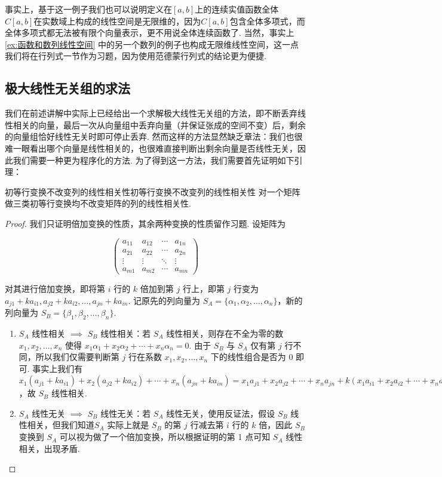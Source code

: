 事实上，基于这一例子我们也可以说明定义在$[a,b]$上的连续实值函数全体$C[a,b]$在实数域上构成的线性空间是无限维的，因为$C[a,b]$包含全体多项式，而全体多项式都无法被有限个向量表示，更不用说全体连续函数了. 当然，事实上\autoref{ex:函数和数列线性空间} 中的另一个数列的例子也构成无限维线性空间，这一点我们将在行列式一节作为习题，因为使用范德蒙行列式的结论更为便捷.

\subsection{极大线性无关组的求法}

我们在前述讲解中实际上已经给出一个求解极大线性无关组的方法，即不断丢弃线性相关的向量，最后一次从向量组中丢弃向量（并保证张成的空间不变）后，剩余的向量组恰好线性无关时即可停止丢弃. 然而这样的方法显然缺乏章法：我们也很难一眼看出哪个向量是线性相关的，也很难直接判断出剩余向量是否线性无关，因此我们需要一种更为程序化的方法. 为了得到这一方法，我们需要首先证明如下引理：

\begin{lemma}{初等行变换不改变列的线性相关性}{初等行变换不改变列的线性相关性}
    对一个矩阵做三类初等行变换均不改变矩阵的列的线性相关性.
\end{lemma}

\begin{proof}
    我们只证明倍加变换的性质，其余两种变换的性质留作习题. 设矩阵为

    \[\begin{pmatrix}
            a_{11} & a_{12} & \cdots & a_{1n} \\
            a_{21} & a_{22} & \cdots & a_{2n} \\
            \vdots & \vdots & \ddots & \vdots \\
            a_{m1} & a_{m2} & \cdots & a_{mn}
        \end{pmatrix}\]

    对其进行倍加变换，即将第 $i$ 行的 $k$ 倍加到第 $j$ 行上，即第 $j$ 行变为 $a_{j1} + ka_{i1}, a_{j2} + ka_{i2}, \ldots, a_{jn} + ka_{in}$. 记原先的列向量为 $S_A = \{\alpha_1, \alpha_2, \ldots, \alpha_n\}$，新的列向量为 $S_B = \{\beta_1, \beta_2, \ldots, \beta_n\}$.

    \begin{enumerate}
        \item $S_A$ 线性相关 $\implies$ $S_B$ 线性相关：若 $S_A$ 线性相关，则存在不全为零的数 $x_1, x_2, \ldots, x_n$ 使得 $x_1\alpha_1 + x_2\alpha_2 + \cdots + x_n\alpha_n = 0$. 由于 $S_B$ 与 $S_A$ 仅有第 $j$ 行不同，所以我们仅需要判断第 $j$ 行在系数 $x_1, x_2, \ldots, x_n$ 下的线性组合是否为 0 即可. 事实上我们有 $x_1(a_{j1} + ka_{i1}) + x_2(a_{j2} + ka_{i2}) + \cdots + x_n(a_{jn} + ka_{in}) = x_1a_{j1} + x_2a_{j2} + \cdots + x_na_{jn} + k(x_1a_{i1} + x_2a_{i2} + \cdots + x_na_{in}) = 0$，故 $S_B$ 线性相关.
        \item $S_A$ 线性无关 $\implies$ $S_B$ 线性无关：若 $S_A$ 线性无关，使用反证法，假设 $S_B$ 线性相关，但我们知道$S_A$ 实际上就是 $S_B$ 的第 $j$ 行减去第 $i$ 行的 $k$ 倍，因此 $S_B$ 变换到 $S_A$ 可以视为做了一个倍加变换，所以根据证明的第 1 点可知 $S_A$ 线性相关，出现矛盾.
    \end{enumerate}
\end{proof}

